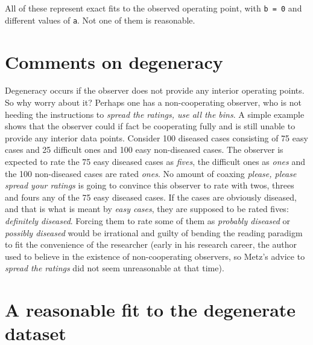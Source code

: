\documentclass[
]{book}
\begin{document}
All of these represent exact fits to the observed operating point, with \texttt{b\ =\ 0} and different values of \texttt{a}. Not one of them is reasonable.

\hypertarget{comments-on-degeneracy}{%
\section{Comments on degeneracy}\label{comments-on-degeneracy}}

Degeneracy occurs if the observer does not provide any interior operating points. So why worry about it? Perhaps one has a non-cooperating observer, who is not heeding the instructions to \emph{spread the ratings, use all the bins}. A simple example shows that the observer could if fact be cooperating fully and is still unable to provide any interior data points. Consider 100 diseased cases consisting of 75 easy cases and 25 difficult ones and 100 easy non-diseased cases. The observer is expected to rate the 75 easy diseased cases as \emph{fives}, the difficult ones as \emph{ones} and the 100 non-diseased cases are rated \emph{ones}. No amount of coaxing \emph{please, please spread your ratings} is going to convince this observer to rate with twos, threes and fours any of the 75 easy diseased cases. If the cases are obviously diseased, and that is what is meant by \emph{easy cases}, they are supposed to be rated fives: \emph{definitely diseased}. Forcing them to rate some of them as \emph{probably diseased} or \emph{possibly diseased} would be irrational and guilty of bending the reading paradigm to fit the convenience of the researcher (early in his research career, the author used to believe in the existence of non-cooperating observers, so Metz's advice to \emph{spread the ratings} did not seem unreasonable at that time).

\hypertarget{a-reasonable-fit-to-the-degenerate-dataset}{%
\section{A reasonable fit to the degenerate dataset}\label{a-reasonable-fit-to-the-degenerate-dataset}}
\end{document}
